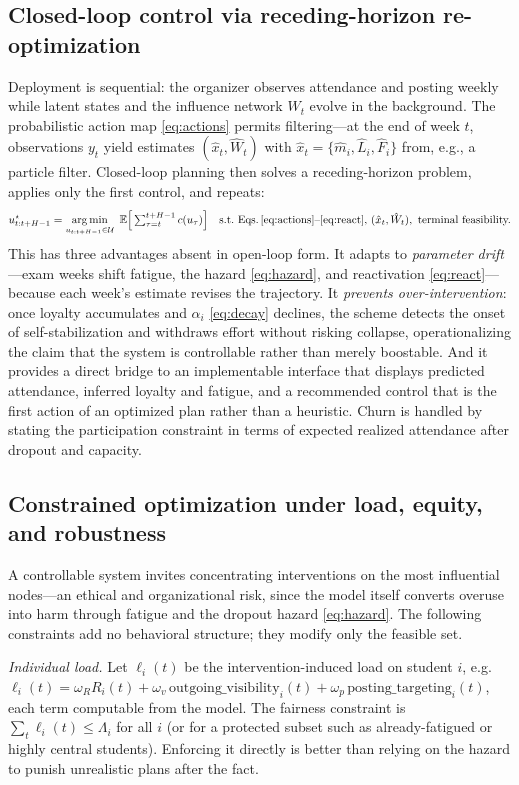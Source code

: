 \documentclass[11pt]{article}
\DeclareMathOperator*{\argmin}{arg\,min}
\begin{document}
\subsection{Closed-loop control via receding-horizon re-optimization}
Deployment is sequential: the organizer observes attendance and posting weekly while latent states and the influence network $W_t$ evolve in the background. The probabilistic action map \eqref{eq:actions} permits filtering---at the end of week $t$, observations $y_t$ yield estimates $(\hat x_t,\hat W_t)$ with $\hat x_t=\{\hat m_i,\hat L_i,\hat F_i\}$ from, e.g., a particle filter. Closed-loop planning then solves a receding-horizon problem, applies only the first control, and repeats:
\begin{equation*}
u^\star_{t:t+H-1}=\argmin_{u_{t:t+H-1}\in\mathcal U}\ \mathbb{E}\Big[\textstyle\sum_{\tau=t}^{t+H-1}c(u_\tau)\Big]
\quad\text{s.t.\ Eqs.\,\eqref{eq:actions}--\eqref{eq:react},}\ (\hat x_t,\hat W_t),\ \text{terminal feasibility.}
\end{equation*}
This has three advantages absent in open-loop form. It adapts to \emph{parameter drift}---exam weeks shift fatigue, the hazard \eqref{eq:hazard}, and reactivation \eqref{eq:react}---because each week's estimate revises the trajectory. It \emph{prevents over-intervention}: once loyalty accumulates and $\alpha_i$ \eqref{eq:decay} declines, the scheme detects the onset of self-stabilization and withdraws effort without risking collapse, operationalizing the claim that the system is controllable rather than merely boostable. And it provides a direct bridge to an implementable interface that displays predicted attendance, inferred loyalty and fatigue, and a recommended control that is the first action of an optimized plan rather than a heuristic. Churn is handled by stating the participation constraint in terms of expected realized attendance after dropout and capacity.

\subsection{Constrained optimization under load, equity, and robustness}
A controllable system invites concentrating interventions on the most influential nodes---an ethical and organizational risk, since the model itself converts overuse into harm through fatigue and the dropout hazard \eqref{eq:hazard}. The following constraints add no behavioral structure; they modify only the feasible set.

\emph{Individual load.} Let $\ell_i(t)$ be the intervention-induced load on student $i$, e.g.\ $\ell_i(t)=\omega_R R_i(t)+\omega_v\,\mathrm{outgoing\_visibility}_i(t)+\omega_p\,\mathrm{posting\_targeting}_i(t)$, each term computable from the model. The fairness constraint is $\sum_t \ell_i(t)\le\Lambda_i$ for all $i$ (or for a protected subset such as already-fatigued or highly central students). Enforcing it directly is better than relying on the hazard to punish unrealistic plans after the fact.
\end{document}
